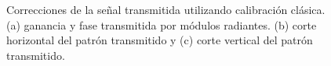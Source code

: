 \begin{figure}[H]
	\centering

	\caption{Correcciones de la señal transmitida utilizando calibración clásica. (a) ganancia y fase transmitida por módulos
		radiantes. (b) corte horizontal del patrón transmitido y (c) corte vertical del patrón transmitido.}
	\label{fig:nonErrClassical10degRow}
\end{figure}

